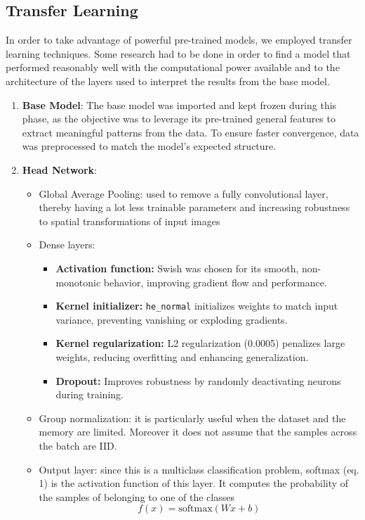 \documentclass[11pt]{article}
\begin{document}
\begin{multicols}{2}
        \subsection{Transfer Learning}
        In order to take advantage of powerful pre-trained models, we employed transfer learning techniques.
        Some research had to be done in order to find a model that performed reasonably well with the computational power available and to the architecture of the layers used to interpret the results from the base model.
        \begin{enumerate}
            \item \textbf{Base Model}:
            The base model was imported and kept frozen during this phase, as the objective was to leverage its pre-trained general features to extract meaningful patterns from the data. To ensure faster convergence, data was preprocessed to match the model's expected structure.
            \item \textbf{Head Network}:
              \begin{itemize}
                  \item Global Average Pooling: used to remove a fully convolutional layer, thereby having a lot less trainable parameters and increasing robustness to spatial transformations of input images
                  \item Dense layers:
                    \begin{itemize}
    \item \textbf{Activation function:} Swish was chosen for its smooth, non-monotonic behavior, improving gradient flow and performance.
    \item \textbf{Kernel initializer:} \texttt{he\_normal} initializes weights to match input variance, preventing vanishing or exploding gradients.
    \item \textbf{Kernel regularization:} L2 regularization (0.0005) penalizes large weights, reducing overfitting and enhancing generalization.
    \item \textbf{Dropout:} Improves robustness by randomly deactivating neurons during training.
\end{itemize}


                  \item Group normalization: it is particularly useful when the dataset and the memory are limited. Moreover it does not assume that the samples across the batch are IID. 
                  \item Output layer: since this is a multiclass classification problem, softmax (eq. 1) is the activation function of this layer. It computes the probability of the samples of belonging to one of the classes
                  \begin{equation}
                    \label{eq:model}
                    f(x) = \text{softmax}(Wx + b)
                  \end{equation}
                  

\end{itemize}
\end{enumerate}
\end{multicols}
\end{document}
